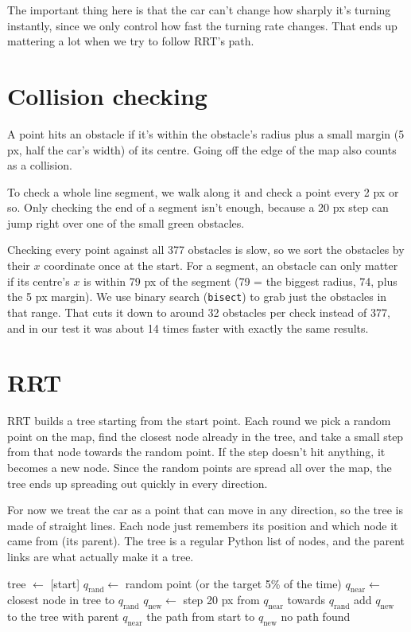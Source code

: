 \documentclass[11pt]{article}
\newcommand{\code}[1]{\texttt{#1}}
\begin{document}
The important thing here is that the car can't change how sharply it's turning instantly, since we only
control how fast the turning rate changes. That ends up mattering a lot when we try to follow RRT's path.

\section{Collision checking}

A point hits an obstacle if it's within the obstacle's radius plus a small margin (5 px, half the car's
width) of its centre. Going off the edge of the map also counts as a collision.

To check a whole line segment, we walk along it and check a point every 2 px or so. Only checking the
end of a segment isn't enough, because a 20 px step can jump right over one of the small green obstacles.

Checking every point against all 377 obstacles is slow, so we sort the obstacles by their $x$ coordinate
once at the start. For a segment, an obstacle can only matter if its centre's $x$ is within 79 px of the
segment (79 = the biggest radius, 74, plus the 5 px margin). We use binary search (\code{bisect}) to grab
just the obstacles in that range. That cuts it down to around 32 obstacles per check instead of 377, and
in our test it was about 14 times faster with exactly the same results.

\section{RRT}

RRT builds a tree starting from the start point. Each round we pick a random point on the map, find the
closest node already in the tree, and take a small step from that node towards the random point. If the
step doesn't hit anything, it becomes a new node. Since the random points are spread all over the map,
the tree ends up spreading out quickly in every direction.

For now we treat the car as a point that can move in any direction, so the tree is made of straight lines.
Each node just remembers its position and which node it came from (its parent). The tree is a regular
Python list of nodes, and the parent links are what actually make it a tree.

\begin{algorithm}[h]
\caption{Our RRT}
\begin{algorithmic}[1]
\State tree $\gets$ [start]
  \State $q_{\text{rand}} \gets$ random point (or the target 5\% of the time)
  \State $q_{\text{near}} \gets$ closest node in tree to $q_{\text{rand}}$
  \State $q_{\text{new}} \gets$ step 20 px from $q_{\text{near}}$ towards $q_{\text{rand}}$
    \State add $q_{\text{new}}$ to the tree with parent $q_{\text{near}}$
      \State \Return the path from start to $q_{\text{new}}$
    \EndIf
  \EndIf
\EndFor
\State \Return no path found
\end{algorithmic}
\end{algorithm}
\end{document}
